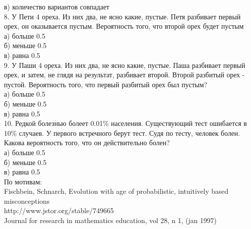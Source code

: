 \documentclass[12pt,a4paper]{amsart}
\begin{document}
в) количество вариантов совпадает \\
8. У Пети 4 ореха. Из них два, не ясно какие, пустые. Петя разбивает первый орех, он оказывается пустым. Вероятность того, что второй орех будет пустым\\
а) больше 0.5 \\
б) меньше 0.5 \\
в) равна 0.5 \\
9. У Паши 4 ореха. Из них два, не ясно какие, пустые. Паша разбивает первый орех, и затем, не глядя на результат, разбивает второй. Второй разбитый орех - пустой. Вероятность того, что первый разбитый орех был пустым? \\
а) больше 0.5 \\
б) меньше 0.5 \\
в) равна 0.5 \\
10. Редкой болезнью болеет 0.01\% населения. Существующий тест ошибается в 10\% случаев. У первого встречного берут тест. Судя по тесту, человек болен. Какова вероятность того, что он действительно болен? \\
а) больше 0.5 \\
б) меньше 0.5 \\
в) равна 0.5 \\

По мотивам: \\
Fischbein, Schnarch, Evolution with age of probabilistic, intuitively based misconceptions \\
http://www.jstor.org/stable/749665 \\
Journal for research in mathematics education, vol 28, n 1, (jan 1997) \\
\end{document}
